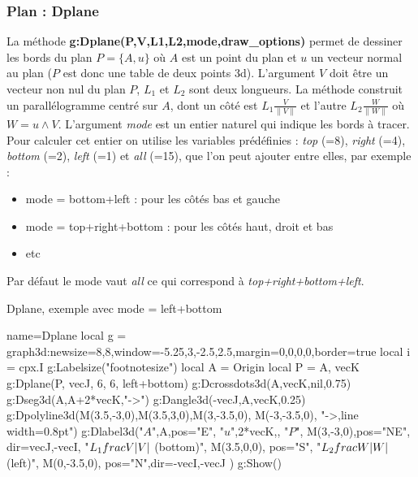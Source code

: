 \subsubsection{Plan : Dplane}

La méthode \textbf{g:Dplane(P,V,L1,L2,mode,draw\_options)} permet de dessiner les bords du plan $P=\{A,u\}$ où $A$ est un point du plan et $u$ un vecteur normal au plan ($P$ est donc une table de deux points 3d). L'argument $V$ doit être un vecteur non nul du plan $P$, $L_1$ et $L_2$ sont deux longueurs. La méthode construit un parallélogramme centré sur $A$, dont un côté est $L_1\frac{V}{\|V\|}$ et l'autre $L_2\frac{W}{\|W\|}$ où $W = u\wedge V$. L'argument \emph{mode} est un entier naturel qui indique les bords à tracer. Pour calculer cet entier on utilise les variables prédéfinies : \emph{top} (=8), \emph{right} (=4), \emph{bottom} (=2), \emph{left} (=1) et \emph{all} (=15), que l'on peut ajouter entre elles, par exemple :
    \begin{itemize}
        \item mode = bottom+left : pour les côtés bas et gauche
        \item mode = top+right+bottom : pour les côtés haut, droit et bas
        \item etc
    \end{itemize}
    Par défaut le mode vaut \emph{all} ce qui correspond à \emph{top+right+bottom+left}.

\begin{demo}{Dplane, exemple avec mode = left+bottom}
\begin{luadraw}{name=Dplane}
local g = graph3d:new{size={8,8},window={-5.25,3,-2.5,2.5},margin={0,0,0,0},border=true}
local i = cpx.I
g:Labelsize("footnotesize")
local A = Origin
local P = {A, vecK}
g:Dplane(P, vecJ, 6, 6, left+bottom)
g:Dcrossdots3d({A,vecK},nil,0.75)
g:Dseg3d({A,A+2*vecK},"->")
g:Dangle3d(-vecJ,A,vecK,0.25)
g:Dpolyline3d({{M(3.5,-3,0),M(3.5,3,0)},{M(3,-3.5,0), M(-3,-3.5,0)}}, "->,line width=0.8pt")
g:Dlabel3d("$A$",A,{pos="E"}, 
    "$u$",2*vecK,{},
    "$P$", M(3,-3,0),{pos="NE", dir={vecJ,-vecI}},
    "$L_1\\frac{V}{\\|V\\|}$ (bottom)", M(3.5,0,0), {pos="S"},
    "$L_2\\frac{W}{\\|W\\|}$ (left)", M(0,-3.5,0), {pos="N",dir={-vecI,-vecJ}}
)
g:Show()
\end{luadraw}
\end{demo}

